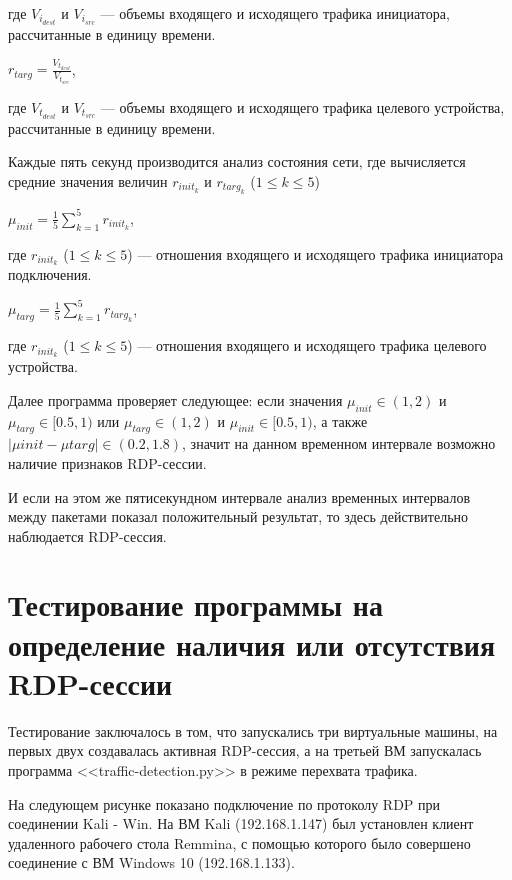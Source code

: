 \documentclass[bachelor, och, coursework]{SCWorks}
\begin{document}
где $V_{i_{dest}}$ и $V_{i_{src}}$ --- объемы входящего и исходящего трафика инициатора, рассчитанные в единицу времени. 

\begin{center}
  $r_{targ} = \frac{V_{t_{dest}}}{V_{t_{src}}}$,
\end{center}

где $V_{t_{dest}}$ и $V_{t_{src}}$ --- объемы входящего и исходящего трафика целевого устройства, рассчитанные в единицу времени. 

Каждые пять секунд производится анализ состояния сети, где вычисляется средние значения величин $r_{init_{k}}$ и $r_{targ_{k}}$ ($1 \leq k \leq 5$)

\begin{center}
  $\mu_{init} = \frac{1}{5}\sum_{k = 1}^{5} r_{init_{k}}$,
\end{center}

где $r_{init_{k}}$ ($1 \leq k \leq 5$) --- отношения входящего и исходящего трафика инициатора подключения.


\begin{center}
  $\mu_{targ} = \frac{1}{5}\sum_{k = 1}^{5} r_{targ_{k}}$,
\end{center}

где $r_{init_{k}}$ ($1 \leq k \leq 5$) --- отношения входящего и исходящего трафика целевого устройства.

Далее программа проверяет следующее: если значения $\mu_{init} \in (1, 2) $ и $\mu_{targ} \in [0.5, 1)$ или 
$\mu_{targ} \in (1, 2) $ и $\mu_{init} \in [0.5, 1)$, а также $|\mu{init} - \mu{targ}| \in (0.2, 1.8)$, значит 
на данном временном интервале возможно наличие признаков RDP-сессии. 

И если на этом же пятисекундном интервале анализ временных интервалов между пакетами показал положительный результат, то здесь действительно
наблюдается RDP-сессия.


\section{Тестирование программы на определение наличия или отсутствия RDP-сессии}

Тестирование заключалось в том, что запускались три виртуальные машины, на первых двух создавалась активная RDP-сессия,
а на третьей ВМ запускалась программа <<traffic-detection.py>> в режиме перехвата трафика.

На следующем рисунке показано подключение по протоколу RDP при соединении Kali - Win. На ВМ Kali (192.168.1.147) был установлен клиент удаленного
рабочего стола Remmina, с помощью которого было совершено соединение с ВМ Windows 10 (192.168.1.133).
\end{document}
